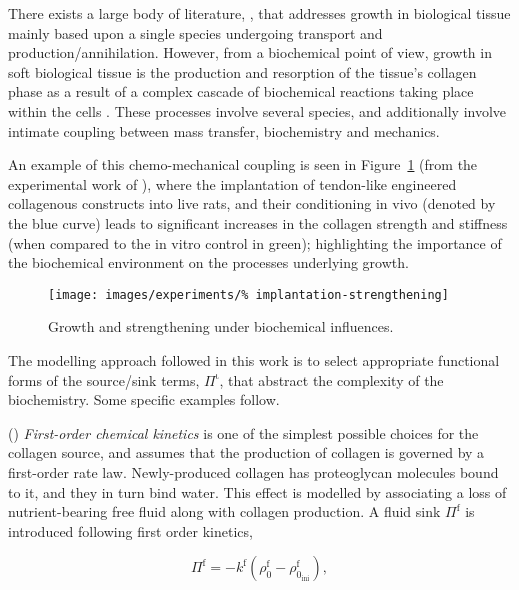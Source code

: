 There exists a large body of literature, \citep{CowinHegedus:76,
  EpsteinMaugin:2000, AmbrosiMollica:2002}, that addresses growth in
biological tissue mainly based upon a single species undergoing
transport and production/annihilation. However, from a biochemical
point of view, growth in soft biological tissue is the production and
resorption of the tissue's collagen phase as a result of a complex
cascade of biochemical reactions taking place within the cells
\citep{Alberts:02}. These processes involve several species, and
additionally involve intimate coupling between mass transfer,
biochemistry and mechanics.

An example of this chemo-mechanical coupling is seen in
Figure~\ref{implantation-strengthening} (from the experimental work of
\citet{calveetal:07}), where the implantation of tendon-like
engineered collagenous constructs into live rats, and their
conditioning in vivo (denoted by the blue curve) leads to significant
increases in the collagen strength and stiffness (when compared to the
in vitro control in green); highlighting the importance of the
biochemical environment on the processes underlying growth.

\begin{figure}
  \centering
  \texttt{[image: images/experiments/\%
    implantation-strengthening]}
  \caption{Growth and strengthening under biochemical influences.}
  \label{implantation-strengthening}
\end{figure}

The modelling approach followed in this work is to select appropriate
functional forms of the source/sink terms, $\Pi^{\mathrm{\iota}}$,
that abstract the complexity of the biochemistry. Some specific
examples follow.

() {\em First-order chemical kinetics} is one of the
simplest possible choices for the collagen source, and assumes that
the production of collagen is governed by a first-order rate
law. Newly-produced collagen has proteoglycan molecules bound to it,
and they in turn bind water. This effect is modelled by associating a
loss of nutrient-bearing free fluid along with collagen production. A
fluid sink $\Pi^\mathrm{f}$ is introduced following first order
kinetics,

\begin{equation}
\Pi^\mathrm{f} = -k^\mathrm{f}(\rho_0^\mathrm{f} -
\rho_{0_\mathrm{ini}}^\mathrm{f}),
\label{first-order-chemical-kinetics-source}
\end{equation}


